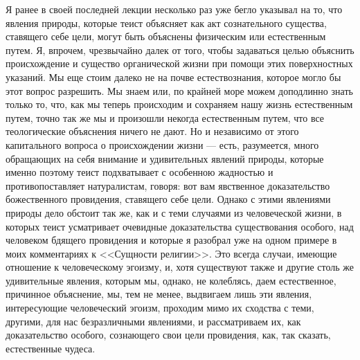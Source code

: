 \documentclass[12pt]{article}
\begin{document}
Я ранее в своей последней лекции несколько раз уже бегло указывал на то, что явления природы, которые теист объясняет как акт сознательного существа, ставящего себе цели, могут быть объяснены физическим или естественным путем. Я, впрочем, чрезвычайно далек от того, чтобы задаваться целью объяснить происхождение и существо органической жизни при помощи этих поверхностных указаний. Мы еще стоим далеко не на почве естествознания, которое могло бы этот вопрос разрешить. Мы знаем или, по крайней море можем доподлинно знать только то, что, как мы теперь происходим и сохраняем нашу жизнь естественным путем, точно так же мы и произошли некогда естественным путем, что все теологические объяснения ничего не дают. Но и независимо от этого капитального вопроса о происхождении жизни --- есть, разумеется, много обращающих на себя внимание и удивительных явлений природы, которые именно поэтому теист подхватывает с особенною жадностью и противопоставляет натуралистам, говоря: вот вам явственное доказательство божественного провидения, ставящего себе цели. Однако с этими явлениями природы дело обстоит так же, как и с теми случаями из человеческой жизни, в которых теист усматривает очевидные доказательства существования особого, над человеком бдящего провидения и которые я разобрал уже на одном примере в моих комментариях к <<Сущности религии>>. Это всегда случаи, имеющие отношение к человеческому эгоизму, и, хотя существуют также и другие столь же удивительные явления, которым мы, однако, не колеблясь, даем естественное, причинное объяснение, мы, тем не менее, выдвигаем лишь эти явления, интересующие человеческий эгоизм, проходим мимо их сходства с теми, другими, для нас безразличными явлениями, и рассматриваем их, как доказательство особого, сознающего свои цели провидения, как, так сказать, естественные чудеса. 
\end{document}
